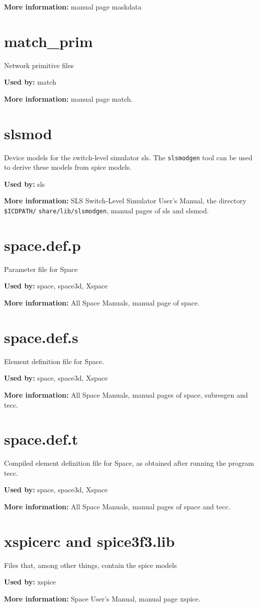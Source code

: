 \textbf{More information:} manual page maskdata

\section{match\_prim}
Network primitive files 

\textbf{Used by:} match

\textbf{More information:} manual page match.

\section{slsmod}
Device models for the switch-level simulator sls.
The \texttt{slsmodgen} tool can be used to derive these models
from spice models.

\textbf{Used by:} sls

\textbf{More information:} SLS Switch-Level Simulator User's Manual, 
the directory \texttt{\$ICDPATH/} \texttt{share/lib/slsmodgen}, 
manual pages of sls and slsmod.

\section{space.def.p}
Parameter file for Space 

\textbf{Used by:} space, space3d, Xspace

\textbf{More information:} All Space Manuals, manual page of space.

\section{space.def.s}  
Element definition file for Space.

\textbf{Used by:} space, space3d, Xspace

\textbf{More information:} All Space Manuals, manual pages of space, subresgen and tecc.

\section{space.def.t}  
Compiled element definition file for Space, as obtained after 
running the program tecc.

\textbf{Used by:} space, space3d, Xspace

\textbf{More information:} All Space Manuals, manual pages of space and tecc.

\section{xspicerc and spice3f3.lib}
Files that, among other things, contain the spice models 

\textbf{Used by:} xspice

\textbf{More information:} Space User's Manual, manual page xspice.
